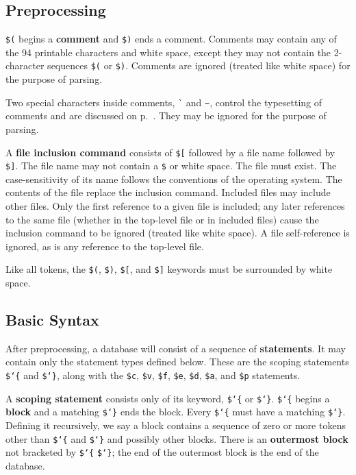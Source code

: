 \subsection{Preprocessing}

\texttt{\$(} begins a {\bf comment} and \texttt{\$)} ends a comment.  Comments may contain any of
the 94 printable characters and white space, except they may not contain the
2-character sequences \texttt{\$(} or \texttt{\$)}.  Comments are ignored (treated
like white space) for the purpose of parsing.

Two special characters inside comments, \verb$`$ and \verb$~$, control the
typesetting of comments and are discussed on p.~\pageref{mathcomments}. They
may be ignored for the purpose of parsing.

A {\bf file inclusion command} consists of \texttt{\$[} followed by a file name
followed by \texttt{\$]}.  The file name may not
contain a \texttt{\$} or white space.  The file must exist.  The case-sensitivity
of its name follows the conventions of the operating system.  The contents of
the file replace the inclusion command.  Included files may include other
files. Only the first reference to a given file is included; any later
references to the same file (whether in the top-level file or in included
files) cause the inclusion command to be ignored (treated like white space).
A file self-reference is ignored, as is any reference to the top-level file.

Like all tokens, the \texttt{\$(}, \texttt{\$)}, \texttt{\$[}, and \texttt{\$]} keywords
must be surrounded by white space.

\subsection{Basic Syntax}

After preprocessing, a database will consist of a sequence of {\bf
statements}.  It may contain only the statement types defined below.
These are the scoping statements \texttt{\$\char`\{} and
\texttt{\$\char`\}}, along with the \texttt{\$c}, \texttt{\$v},
\texttt{\$f}, \texttt{\$e}, \texttt{\$d}, \texttt{\$a}, and \texttt{\$p}
statements.

A {\bf scoping statement} consists only of its
keyword, \texttt{\$\char`\{} or \texttt{\$\char`\}}. \texttt{\$\char`\{} begins a {\bf
block} and a matching \texttt{\$\char`\}} ends the block. Every \texttt{\$\char`\{}
must have a matching \texttt{\$\char`\}}. Defining it recursively, we say a block
contains a sequence of zero or more tokens other
than \texttt{\$\char`\{} and \texttt{\$\char`\}} and
possibly other blocks.  There is an {\bf outermost
block} not bracketed by \texttt{\$\char`\{} \texttt{\$\char`\}}; the end
of the outermost block is the end of the database.

